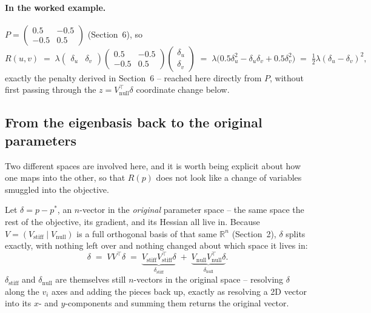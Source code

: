 \documentclass[11pt]{article}
\begin{document}
\paragraph{In the worked example.} $P=\begin{pmatrix}0.5&-0.5\\-0.5&0.5\end{pmatrix}$
(Section~6), so
\begin{equation}
  R(u,v) \;=\; \lambda\begin{pmatrix}\delta_u&\delta_v\end{pmatrix}
  \begin{pmatrix}0.5&-0.5\\-0.5&0.5\end{pmatrix}
  \begin{pmatrix}\delta_u\\\delta_v\end{pmatrix}
  \;=\; \lambda\big(0.5\delta_u^2 - \delta_u\delta_v + 0.5\delta_v^2\big)
  \;=\; \tfrac12\lambda(\delta_u-\delta_v)^2,
\end{equation}
exactly the penalty derived in Section~6 -- reached here directly from $P$,
without first passing through the $z=V_{\mathrm{null}}^\top\delta$ coordinate
change below.

\subsection*{From the eigenbasis back to the original parameters}

Two different spaces are involved here, and it is worth being explicit about
how one maps into the other, so that $R(p)$ does not look like a change of
variables smuggled into the objective.

Let $\delta = p-p^*$, an $n$-vector in the \emph{original} parameter space --
the same space the rest of the objective, its gradient, and its Hessian all
live in. Because $V = (V_{\mathrm{stiff}} \mid V_{\mathrm{null}})$ is a full
orthogonal basis of that same $\mathbb{R}^n$ (Section~2), $\delta$ splits
exactly, with nothing left over and nothing changed about which space it
lives in:
\begin{equation}
  \delta \;=\; VV^\top\delta \;=\;
  \underbrace{V_{\mathrm{stiff}}V_{\mathrm{stiff}}^\top\delta}_{\delta_{\mathrm{stiff}}}
  \;+\;
  \underbrace{V_{\mathrm{null}}V_{\mathrm{null}}^\top\delta}_{\delta_{\mathrm{null}}}.
\end{equation}
$\delta_{\mathrm{stiff}}$ and $\delta_{\mathrm{null}}$ are themselves still
$n$-vectors in the original space -- resolving $\delta$ along the $v_i$ axes
and adding the pieces back up, exactly as resolving a 2D vector into its
$x$- and $y$-components and summing them returns the original vector.
\end{document}
